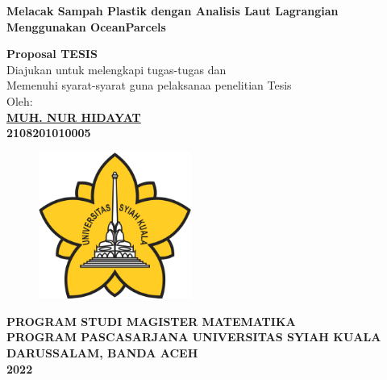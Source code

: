 \begin{spacing}{1}
	\begin{center}
		{\Large\textbf{Melacak Sampah Plastik dengan Analisis Laut Lagrangian Menggunakan OceanParcels}}\\[1.0cm]
	\end{center}
	\vspace*{0.8cm} 
	
	\begin{center}
		
		\large{\textbf{Proposal TESIS}}
		\\\vspace*{1.8cm}    
		\normalsize{Diajukan untuk melengkapi tugas-tugas dan \\
			Memenuhi syarat-syarat guna pelaksanaa penelitian Tesis}\\[1.5cm]
		\vspace*{1cm}  
		{\large Oleh:}\\
		\vspace*{1cm}       
		\large{\textbf{\underline{MUH. NUR HIDAYAT}}}
		\\\large{\textbf{2108201010005}} 
	\end{center}\vspace*{1cm}   
	
	\begin{figure}[h]
		\centering
		\includegraphics[width=5cm]{contents/USK} %
	\end{figure}
	\vspace*{1.5cm}   
	
	\begin{center}
		\textbf{PROGRAM STUDI MAGISTER MATEMATIKA \\
			PROGRAM PASCASARJANA UNIVERSITAS SYIAH KUALA\\
			DARUSSALAM, BANDA ACEH\\
			2022}
	\end{center}
	\thispagestyle{empty}
\end{spacing}